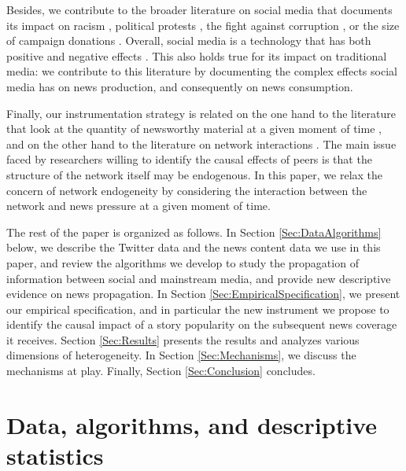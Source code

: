Besides, we contribute to the broader literature on social media that documents its impact on racism \citep{MullerSchwarz2019}, political protests \citep{EnikolopovMakarinPetrova2020}, the fight against corruption \citep{Enikolopovetal2018}, or the size of campaign donations \citep{Petrovaetal2017}. Overall, social media is a technology that has both positive and negative effects \citep{Allcottetal2020}. This also holds true for its impact on traditional media: we contribute to this literature by documenting the complex effects social media has on news production, and consequently on news consumption.

Finally, our instrumentation strategy is related on the one hand to the literature that look at the quantity of newsworthy material at a given moment of time \citep[e.g.][]{EisenseeStromberg2007,DjourelovaDurante2019}, and on the other hand to the literature on network interactions \citep[see][for a recent survey]{BramoulleDjebbariFortin2020}. The main issue faced by researchers willing to identify the causal effects of peers is that the structure of the network itself may be endogenous. In this paper, we relax the concern of network endogeneity by considering the interaction between the network and news pressure at a given moment of time.


\medskip
The rest of the paper is organized as follows. In Section \ref{Sec:DataAlgorithms} below, we describe the Twitter data and the news content data we use in this paper, and review the algorithms we develop to study the propagation of information between social and mainstream media, and provide new descriptive evidence on news propagation. In Section \ref{Sec:EmpiricalSpecification}, we present our empirical specification, and in particular the new instrument we propose to identify the causal impact of a story popularity on the subsequent news coverage it receives. Section \ref{Sec:Results} presents the results and analyzes various dimensions of heterogeneity. In Section \ref{Sec:Mechanisms}, we discuss the mechanisms at play. Finally, Section \ref{Sec:Conclusion} concludes.


\section{Data, algorithms, and descriptive statistics\label{Sec:DataAlgorithms}}

